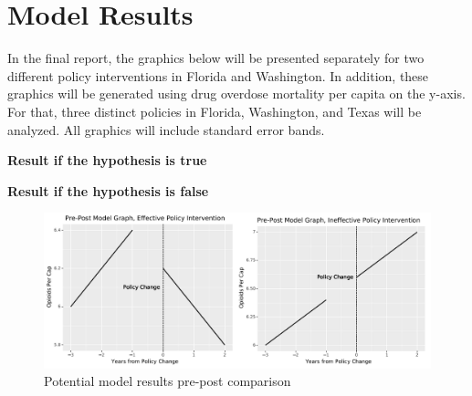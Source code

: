 \documentclass[12pt]{article}
\begin{document}
\section{Model Results}

In the final report, the graphics below will be presented separately for two different policy interventions in Florida and Washington. In addition, these graphics will be generated using drug overdose mortality per capita on the y-axis. For that, three distinct policies in Florida, Washington, and Texas will be analyzed. All graphics will include standard error bands.

\newpage

\begin{minipage}{0.5\textwidth}
\centering
\textbf{Result if the hypothesis is true}
\end{minipage}
\begin{minipage}{0.5\textwidth}
\centering
\textbf{Result if the hypothesis is false}
\end{minipage}

\begin{figure}[H]
    \centering
    \includegraphics[scale=.5]{41_project_strategy_potential_model_results_prepost.png}
    \caption{Potential model results pre-post comparison }
    \label{fig:prepost}
\end{figure}
\end{document}
